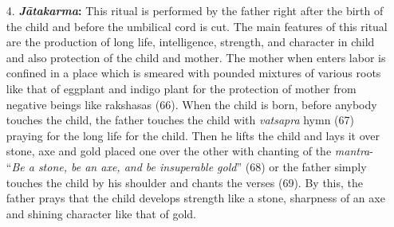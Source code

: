 \begin{enumerate}
\itemsep=0pt
\item[4.]
  \textbf{\emph{Jātakarma}:} This ritual is performed by the father right after the birth of the child and before the umbilical cord is cut. The main features of this ritual are the production of long life, intelligence, strength, and character in child and also protection of the child and mother. The mother when enters labor is confined in a place which is smeared with pounded mixtures of various roots like that of eggplant and indigo plant for the protection of mother from negative beings like rakshasas (66). When the child is born, before anybody touches the child, the father touches the child with \emph{vatsapra} hymn (67) praying for the long life for the child. Then he lifts the child and lays it over stone, axe and gold placed one over the other with chanting of the \emph{mantra}- ``\emph{Be a stone, be an axe, and be insuperable gold}'' (68) or the father simply touches the child by his shoulder and chants the verses (69). By this, the father prays that the child develops strength like a stone, sharpness of an axe and shining character like that of gold.


\end{enumerate}
